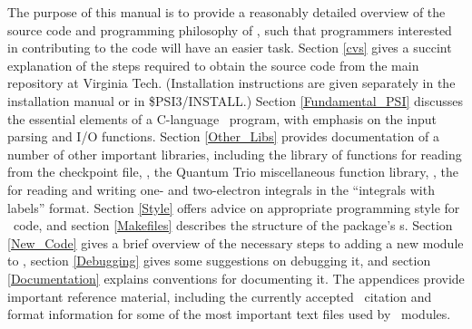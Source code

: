 %
%
%
%

The purpose of this manual is to provide a reasonably detailed
overview of the source code and programming philosophy of \PSIthree,
such that programmers interested in contributing to the code will have
an easier task.  Section \ref{cvs} gives a succint explanation of the
steps required to obtain the source code from the main repository at
Virginia Tech.  (Installation instructions are given separately in the
installation manual or in \$PSI3/INSTALL.)  Section
\ref{Fundamental_PSI} discusses the essential elements of a C-language
\PSIthree\ program, with emphasis on the input parsing and I/O
functions.  Section \ref{Other_Libs} provides documentation of a
number of other important libraries, including the library of
functions for reading from the checkpoint file, ,
the Quantum Trio miscellaneous function library, ,
the  for reading and writing one- and two-electron
integrals in the ``integrals with labels'' format.  Section
\ref{Style} offers advice on appropriate programming style for
\PSIthree\ code, and section \ref{Makefiles} describes the structure
of the package's s.  Section \ref{New_Code} gives a
brief overview of the necessary steps to adding a new module to
\PSIthree, section \ref{Debugging} gives some suggestions on debugging
it, and section \ref{Documentation} explains conventions for
documenting it.  The appendices provide important reference material,
including the currently accepted \PSIthree\ citation and format
information for some of the most important text files used by
\PSIthree\ modules.
